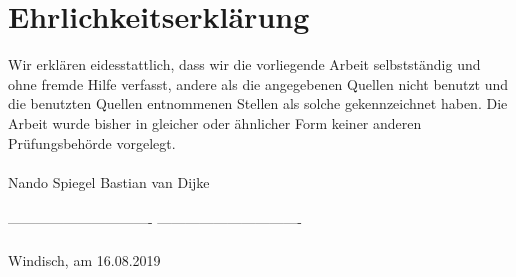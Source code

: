 \section*{Ehrlichkeitserklärung}
Wir erklären eidesstattlich, dass wir die vorliegende Arbeit selbstständig und ohne fremde Hilfe verfasst, andere als die angegebenen Quellen nicht benutzt und die benutzten Quellen entnommenen Stellen als solche gekennzeichnet haben. Die Arbeit wurde bisher in gleicher oder ähnlicher Form keiner anderen Prüfungsbehörde vorgelegt.\\\\

Nando Spiegel \hspace{8cm} Bastian van Dijke\vspace{2cm}\\\\
------------------------------- \hspace{6.45cm} -------------------------------\\\\



Windisch, am 16.08.2019 